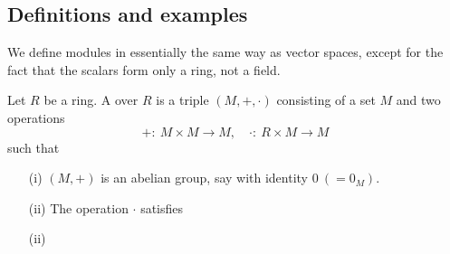\documentclass[egregdoesnotlikesansseriftitles,a4paper]{scrartcl}
\begin{document}
\subsection{Definitions and examples}
We define modules in essentially the same way as vector spaces, except for the fact that the scalars form only a ring, not a field.
\begin{definition*}[Module]
       Let $R$ be a ring. A  over $R$ is a triple $(M, +, \cdot )$ consisting of a set $M$ and two operations \[
       +: \ M \times M \rightarrow M, \quad \cdot : \ R \times M \rightarrow M
       \] such that
       \begin{itemize}
             \item[(i)] $(M,+)$ is an abelian group, say with identity $0 \ (=0_{M})$.
             \item[(ii)] The operation $\cdot $ satisfies 
             \item[(ii)] 
       \end{itemize}
\end{definition*}
\end{document}
